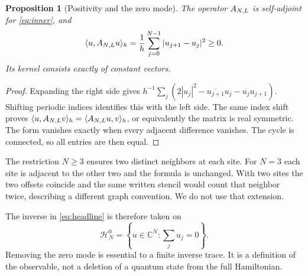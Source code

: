 \documentclass[11pt,a4paper]{article}
\newtheorem{proposition}[theorem]{Proposition}
\theoremstyle{definition}\newtheorem{definition}[theorem]{Definition}
\theoremstyle{remark}\newtheorem{remark}[theorem]{Remark}
\newcommand{\C}{\mathbb C}\newcommand{\R}{\mathbb R}\newcommand{\Z}{\mathbb Z}
\newcommand{\ip}[2]{\langle #1,#2\rangle_h}
\numberwithin{equation}{section}
\begin{document}
\begin{proposition}[Positivity and the zero mode]\label{prop:positive}
The operator \(A_{N,L}\) is self-adjoint for \eqref{eq:inner}, and
\begin{equation}
 \ip{u}{\AN u}=\frac1h\sum_{j=0}^{N-1}|u_{j+1}-u_j|^2\geq0.
 \label{eq:form}
\end{equation}
Its kernel consists exactly of constant vectors.
\end{proposition}
\begin{proof}
Expanding the right side gives
\(h^{-1}\sum_j(2|u_j|^2-\overline{u_{j+1}}u_j-
\overline{u_j}u_{j+1})\). Shifting periodic indices identifies this
with the left side. The same index shift proves
\(\ip{u}{\AN v}=\ip{\AN u}{v}\), or equivalently the matrix is real
symmetric. The form vanishes exactly when every adjacent difference
vanishes. The cycle is connected, so all entries are then equal.
\end{proof}
The restriction \(N\geq3\) ensures two distinct neighbors at each site.
For \(N=3\) each site is adjacent to the other two and the formula is
unchanged. With two sites the two offsets coincide and the same written
stencil would count that neighbor twice, describing a different graph
convention. We do not use that extension.

The inverse in \eqref{eq:headline} is therefore taken on
\begin{equation}
 \mathcal H_N^0=\left\{u\in\C^N:\sum_j u_j=0\right\}.
 \label{eq:meanfree}
\end{equation}
Removing the zero mode is essential to a finite inverse trace. It is a
definition of the observable, not a deletion of a quantum state from the
full Hamiltonian.
\end{document}
